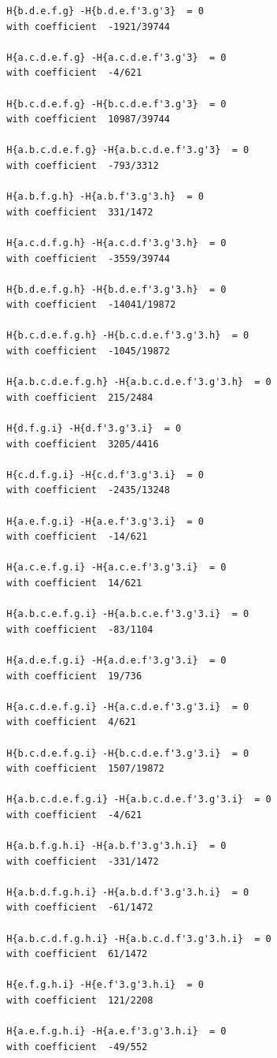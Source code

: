 \documentclass[11pt, a4paper]{kybernetika}
\begin{document}
\begin{verbatim}
		H{b.d.e.f.g} -H{b.d.e.f'3.g'3}  = 0
		with coefficient  -1921/39744
		
		H{a.c.d.e.f.g} -H{a.c.d.e.f'3.g'3}  = 0
		with coefficient  -4/621
		
		H{b.c.d.e.f.g} -H{b.c.d.e.f'3.g'3}  = 0
		with coefficient  10987/39744
		
		H{a.b.c.d.e.f.g} -H{a.b.c.d.e.f'3.g'3}  = 0
		with coefficient  -793/3312
		
		H{a.b.f.g.h} -H{a.b.f'3.g'3.h}  = 0
		with coefficient  331/1472
		
		H{a.c.d.f.g.h} -H{a.c.d.f'3.g'3.h}  = 0
		with coefficient  -3559/39744
		
		H{b.d.e.f.g.h} -H{b.d.e.f'3.g'3.h}  = 0
		with coefficient  -14041/19872
		
		H{b.c.d.e.f.g.h} -H{b.c.d.e.f'3.g'3.h}  = 0
		with coefficient  -1045/19872
		
		H{a.b.c.d.e.f.g.h} -H{a.b.c.d.e.f'3.g'3.h}  = 0
		with coefficient  215/2484
		
		H{d.f.g.i} -H{d.f'3.g'3.i}  = 0
		with coefficient  3205/4416
		
		H{c.d.f.g.i} -H{c.d.f'3.g'3.i}  = 0
		with coefficient  -2435/13248
		
		H{a.e.f.g.i} -H{a.e.f'3.g'3.i}  = 0
		with coefficient  -14/621
		
		H{a.c.e.f.g.i} -H{a.c.e.f'3.g'3.i}  = 0
		with coefficient  14/621
		
		H{a.b.c.e.f.g.i} -H{a.b.c.e.f'3.g'3.i}  = 0
		with coefficient  -83/1104
		
		H{a.d.e.f.g.i} -H{a.d.e.f'3.g'3.i}  = 0
		with coefficient  19/736
		
		H{a.c.d.e.f.g.i} -H{a.c.d.e.f'3.g'3.i}  = 0
		with coefficient  4/621
		
		H{b.c.d.e.f.g.i} -H{b.c.d.e.f'3.g'3.i}  = 0
		with coefficient  1507/19872
		
		H{a.b.c.d.e.f.g.i} -H{a.b.c.d.e.f'3.g'3.i}  = 0
		with coefficient  -4/621
		
		H{a.b.f.g.h.i} -H{a.b.f'3.g'3.h.i}  = 0
		with coefficient  -331/1472
		
		H{a.b.d.f.g.h.i} -H{a.b.d.f'3.g'3.h.i}  = 0
		with coefficient  -61/1472
		
		H{a.b.c.d.f.g.h.i} -H{a.b.c.d.f'3.g'3.h.i}  = 0
		with coefficient  61/1472
		
		H{e.f.g.h.i} -H{e.f'3.g'3.h.i}  = 0
		with coefficient  121/2208
		
		H{a.e.f.g.h.i} -H{a.e.f'3.g'3.h.i}  = 0
		with coefficient  -49/552
		

\end{verbatim}
\end{document}

